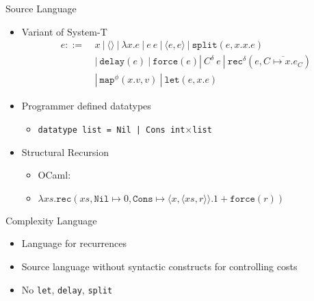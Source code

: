 \documentclass[pdf]{beamer}
\newcommand{\T}[1]{\texttt{#1}}
\newcommand{\LP}{\langle}
\newcommand{\RP}{\rangle}
\begin{document}
\begin{frame}{Source Language}
  \begin{itemize}
    \item Variant of System-T
      \begin{align*}
        e ::=\ &x\ |\ \LP\RP\ |\ \lambda x.e\ |\ e\ e\ |\ \LP e,e\RP\ |\ \T{split}(e, x.x.e) \\
               &|\ \T{delay}(e)\ |\ \T{force}(e)|\ C^\delta\ e\ |\ \T{rec}^\delta(e, \overline{C \mapsto x.e_C}) \\
               &|\ \T{map}^\phi(x.v, v)\ |\ \T{let}(e, x.e)
      \end{align*}
    \vfill
    \item Programmer defined datatypes
      \begin{itemize}
        \item \T{datatype list = Nil | Cons int$\times$list}
      \end{itemize}
    \vfill
    \item Structural Recursion
      \begin{itemize}
        \item OCaml: \lstlength
        \item $\lambda xs.\T{rec}(xs, \T{Nil}\mapsto 0, \T{Cons}\mapsto\LP x,\LP xs,r\RP\RP.1 + \T{force}(r))$
      \end{itemize}
    \vfill
  \end{itemize}
\end{frame}

\begin{frame}{Complexity Language}
  \begin{itemize}
    \item Language for recurrences
    \vfill
    \item Source language without syntactic constructs for controlling costs
    \vfill
    \item No \T{let}, \T{delay}, \T{split}
  \end{itemize}
\end{frame}
\end{document}
